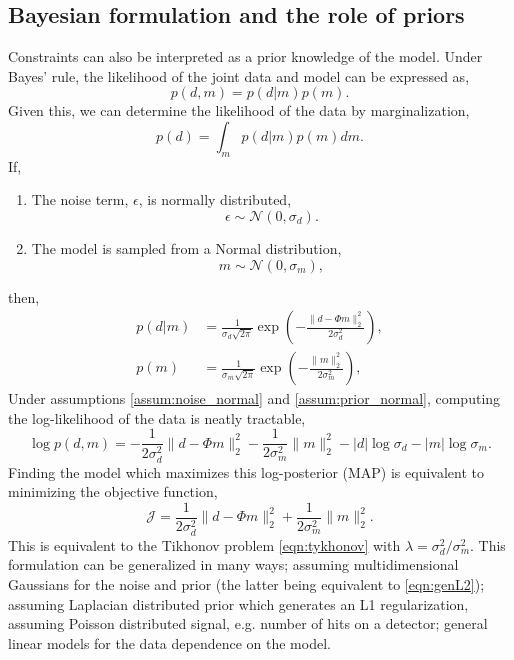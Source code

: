 \documentclass[12pt]{article}
\begin{document}
\subsection{Bayesian formulation and the role of priors}\label{sec:bayes}
Constraints can also be interpreted as a prior knowledge of the model. Under Bayes' rule, the likelihood of the joint data and model can be expressed as,
\begin{equation}
p(d,m)=p(d | m) p(m).\label{eqn:jointdistr}
\end{equation}
Given this, we can determine the likelihood of the data by marginalization,
\begin{equation}
p(d)=\int_m p(d|m)p(m) dm.\label{eqn:datadistr}
\end{equation}
If,  
\begin{enumerate}
\item \label{assum:noise_normal} The noise term, $\epsilon$, is normally distributed, 
\begin{equation}
\epsilon \sim \mathcal{N}(0, \sigma_d).
\end{equation}
\item \label{assum:prior_normal} The model is sampled from a Normal distribution,
\begin{equation}
m \sim \mathcal{N}(0, \sigma_m),
\end{equation}
\end{enumerate}
then, 
\begin{align}
p(d | m) &= \frac{1}{\sigma_d \sqrt{2 \pi}}\exp{\left( -\frac{\|d-\Phi m\|_2^2}{2\sigma_d^2}\right)},\nonumber \\
p(m)& = \frac{1}{\sigma_m \sqrt{2 \pi}}\exp{\left( -\frac{\|m\|_2^2}{2\sigma_m^2}\right)},
\end{align}
Under assumptions \ref{assum:noise_normal} and \ref{assum:prior_normal}, computing the log-likelihood of the data is neatly tractable,
\begin{equation}
\log {p(d,m)}=-\frac{1}{2\sigma_d^2}\|d-\Phi m\|_2^2-\frac{1}{2\sigma_m^2}\|m\|_2^2-|d|\log{\sigma_d}-|m|\log{\sigma_m}.\nonumber
\end{equation}
Finding the model which maximizes this log-posterior (MAP) is equivalent to minimizing the objective function,
\begin{equation}
\mathcal{J}=\frac{1}{2\sigma_d^2}\|d-\Phi m\|_2^2+\frac{1}{2\sigma_m^2}\|m\|_2^2.\nonumber
\end{equation}
This is equivalent to the Tikhonov problem \ref{eqn:tykhonov} with $\lambda = \sigma_d^2/\sigma_m^2$.
This formulation can be generalized in many ways;  assuming multidimensional Gaussians for the noise and prior (the latter being equivalent to \ref{eqn:genL2}); assuming Laplacian distributed prior which generates an L1 regularization, assuming Poisson distributed signal, e.g. number of hits on a detector; general linear models for the data dependence on the model. 
 
\end{document}
